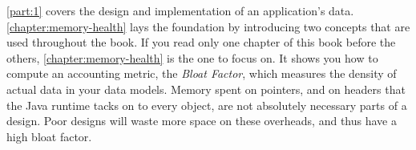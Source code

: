 

\autoref{part:1} covers the design and implementation of an application's data.
\autoref{chapter:memory-health} lays the foundation by introducing two concepts
that are used throughout the book. If you read only one chapter of this book before the others,
\autoref{chapter:memory-health} is the one to focus on.
It shows you how to compute an accounting metric,
the \emph{Bloat Factor}, which measures the density of actual data in your
data models. Memory spent on pointers, and on headers that the Java runtime
tacks on to every object, are not absolutely necessary parts of a design. Poor
designs will waste more space on these overheads, and thus have a high bloat
factor. 

